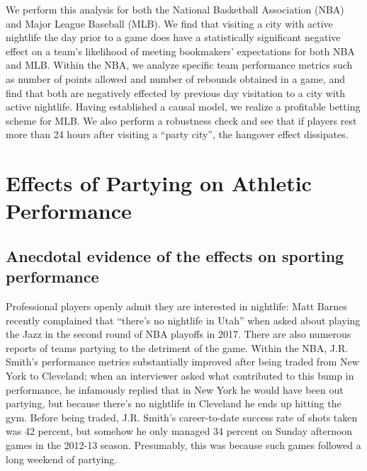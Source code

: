 \documentclass[letterpaper,12pt]{article}
\begin{document}
We perform this analysis for both the National Basketball Association
(NBA) and Major League Baseball (MLB). 
We find that visiting a city with active nightlife the day prior to a game does have a 
statistically significant negative effect on a team's likelihood of meeting bookmakers' expectations
for both NBA and MLB. Within the NBA, we analyze specific team performance metrics such as number of points allowed and number of rebounds obtained in a game, and find that both are negatively effected by previous day visitation to a city with active nightlife. Having established a causal model, we realize a profitable betting scheme for MLB. We also perform a robustness check and see that if players rest more than
 24 hours after visiting a ``party city'', the hangover effect dissipates.

\section{Effects of Partying on Athletic Performance}

\subsection{Anecdotal evidence of the effects on sporting performance}
Professional players openly admit they are interested in nightlife: Matt Barnes recently complained that 
``there's no nightlife in Utah'' when asked about playing the Jazz in the second round of NBA playoffs 
in 2017.\citep{cestone}
There are also numerous reports of teams partying to the detriment of the game.
Within the NBA, J.R. Smith's performance metrics substantially improved 
 after being traded from New York to Cleveland; when an interviewer
asked what contributed to this bump in performance, he infamously replied
that in New York he would have been out partying, but because there's no nightlife in Cleveland he ends up hitting the gym.\citep{price,ley} Before being traded, J.R. Smith's career-to-date success rate of shots taken was 42 percent, but somehow he only managed 
34 percent on Sunday afternoon games in the 2012-13 season.
Presumably, this was because such games followed a long weekend of partying.\citep{princeofthecity}
\end{document}
